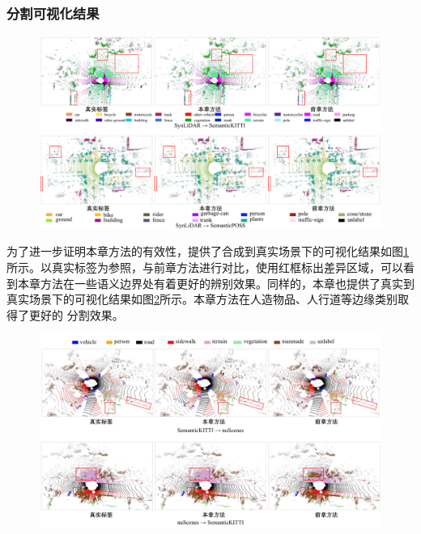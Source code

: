     \subsubsection{分割可视化结果}
    \vspace{-0.1cm}
    \begin{figure}[h]
        \centering
        \includegraphics[width = \textwidth, scale=0.5]{ljx/figure/4-5s2r.pdf}
        \label{fig:4-5}
    \end{figure}
    \vspace{-0.35cm}
    为了进一步证明本章方法的有效性，提供了合成到真实场景下的可视化结果如图\ref{fig:4-5}所示。以真实标签为参照，与前章方法进行对比，使用红框标出差异区域，可以看到本章方法在一些语义边界处有着更好的辨别效果。同样的，本章也提供了真实到真实场景下的可视化结果如图\ref{fig:4-6}所示。本章方法在人造物品、人行道等边缘类别取得了更好的 分割效果。
    \vspace{-0.1cm}
    \begin{figure}[h]
        \centering
        \includegraphics[width = \textwidth, scale=0.5]{ljx/figure/4-6r2r.pdf}
        \label{fig:4-6}
    \end{figure}
    \vspace{-0.35cm}

